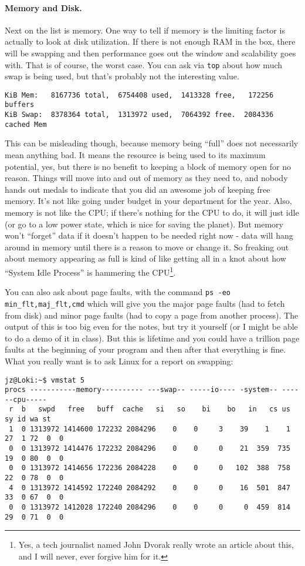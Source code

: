 \paragraph{Memory and Disk.} Next on the list is memory. One way to tell if memory is the limiting factor is actually to look at disk utilization. If there is not enough RAM in the box, there will be swapping and then performance goes out the window and scalability goes with. That is of course, the worst case. You can ask via \texttt{top} about how much swap is being used, but that's probably not the interesting value. 

\begin{verbatim}
KiB Mem:   8167736 total,  6754408 used,  1413328 free,   172256 buffers
KiB Swap:  8378364 total,  1313972 used,  7064392 free.  2084336 cached Mem
\end{verbatim}

This can be misleading though, because memory being ``full'' does not necessarily mean anything bad. It means the resource is being used to its maximum potential, yes, but there is no benefit to keeping a block of memory open for no reason. Things will move into and out of memory as they need to, and nobody hands out medals to indicate that you did an awesome job of keeping free memory. It's not like going under budget in your department for the year.  Also, memory is not like the CPU; if there's nothing for the CPU to do, it will just idle (or go to a low power state, which is nice for saving the planet). But memory won't ``forget'' data if it doesn't happen to be needed right now - data will hang around in memory until there is a reason to move or change it. So freaking out about memory appearing as full is kind of like getting all in a knot about how ``System Idle Process'' is hammering the CPU\footnote{Yes, a tech journalist named John Dvorak really wrote an article about this, and I will never, ever forgive him for it.}.

You can also ask about page faults, with the command \texttt{ps -eo min\_flt,maj\_flt,cmd} which will give you the major page faults (had to fetch from disk) and minor page faults (had to copy a page from another process). The output of this is too big even for the notes, but try it yourself (or I might be able to do a demo of it in class). But this is lifetime and you could have a trillion page faults at the beginning of your program and then after that everything is fine. What you really want is to ask Linux for a report on swapping:

\begin{verbatim}
jz@Loki:~$ vmstat 5
procs -----------memory---------- ---swap-- -----io---- -system-- ------cpu-----
 r  b   swpd   free   buff  cache   si   so    bi    bo   in   cs us sy id wa st
 1  0 1313972 1414600 172232 2084296    0    0     3    39    1    1 27  1 72  0  0
 0  0 1313972 1414476 172232 2084296    0    0     0    21  359  735 19  0 80  0  0
 0  0 1313972 1414656 172236 2084228    0    0     0   102  388  758 22  0 78  0  0
 4  0 1313972 1414592 172240 2084292    0    0     0    16  501  847 33  0 67  0  0
 0  0 1313972 1412028 172240 2084296    0    0     0     0  459  814 29  0 71  0  0
\end{verbatim}


